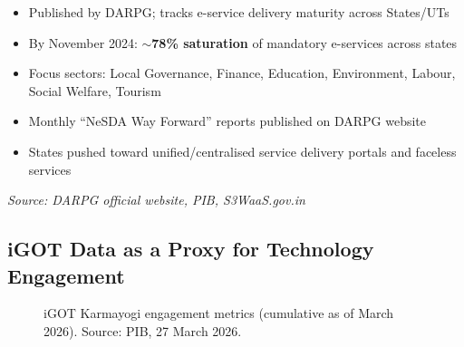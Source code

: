 \documentclass[12pt,a4paper]{article}
\begin{document}
\begin{sourcebox}
\begin{itemize}[leftmargin=1cm]
  \item Published by DARPG; tracks e-service delivery maturity across States/UTs
  \item By November 2024: \textbf{$\sim$78\% saturation} of mandatory e-services across states
  \item Focus sectors: Local Governance, Finance, Education, Environment, Labour, Social Welfare, Tourism
  \item Monthly ``NeSDA Way Forward'' reports published on DARPG website
  \item States pushed toward unified/centralised service delivery portals and faceless services
\end{itemize}
\textit{Source: DARPG official website, PIB, S3WaaS.gov.in}
\end{sourcebox}

\subsection{iGOT Data as a Proxy for Technology Engagement}

\begin{figure}[H]
\centering
{}
\caption{iGOT Karmayogi engagement metrics (cumulative as of March 2026). Source: PIB, 27 March 2026.}
\label{fig:igot_engagement}
\end{figure}
\end{document}
